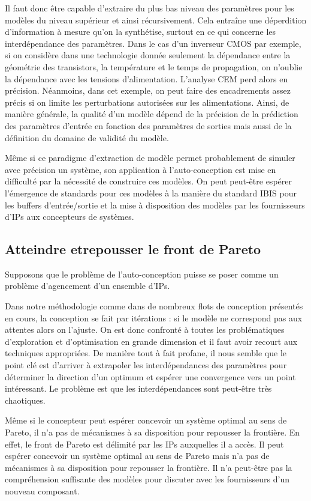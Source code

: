 \documentclass[11pt]{article}
\begin{document}
Il faut donc être capable d'extraire du plus bas niveau des paramètres pour les
modèles du niveau supérieur et ainsi récursivement. Cela entraîne une
déperdition d'information à mesure qu'on la synthétise, surtout en ce qui
concerne les interdépendance des paramètres. Dans le cas d'un inverseur CMOS
par exemple, si on considère dans une technologie donnée seulement la dépendance
entre la géométrie des transistors, la température et le temps de propagation,
on n'oublie la dépendance avec les tensions d'alimentation. L'analyse CEM
perd alors en précision. Néanmoins, dans cet exemple, on peut faire des
encadrements
assez précis si on limite les perturbations autorisées sur les alimentations.
Ainsi, de manière générale, la qualité d'un modèle dépend de la précision de la
prédiction des paramètres d'entrée en fonction des paramètres de sorties mais
aussi de la définition du domaine de validité du modèle.

Même si ce paradigme d'extraction de modèle permet probablement de simuler avec
précision un système, son application à l'auto-conception est mise en difficulté
par la nécessité de construire ces modèles. On peut peut-être espérer 
l'émergence de standards pour ces modèles à la manière du standard IBIS pour les
buffers d'entrée/sortie et la mise à disposition des modèles par les
fournisseurs d'IPs aux concepteurs de systèmes.

\subsection{Atteindre etrepousser le front de Pareto}

Supposons que le problème de l'auto-conception puisse se poser comme un problème
d'agencement d'un ensemble d'IPs.

Dans notre méthodologie comme dans de nombreux flots de conception présentés en
cours, la conception se fait par itérations : si le modèle ne correspond pas aux
attentes alors on l'ajuste. On est donc confronté à toutes les problématiques
d'exploration et d'optimisation en grande dimension et il faut avoir recourt aux
techniques appropriées. De manière tout à fait profane, il nous semble que le 
point clé est d'arriver à extrapoler les interdépendances des paramètres pour
déterminer la direction d'un optimum et espérer une convergence vers un point
intéressant. Le problème est que les interdépendances sont peut-être très 
chaotiques.

Même si le concepteur peut espérer concevoir un système optimal au sens de 
Pareto, il n'a pas de mécanismes à sa disposition pour repousser la frontière. 
En effet, le front de Pareto est délimité par les IPs auxquelles il a accès. 
Il peut espérer concevoir un système optimal au sens de Pareto mais n'a pas de 
mécanismes à sa disposition pour repousser la frontière. Il n'a peut-être pas la
compréhension suffisante des modèles pour discuter avec les fournisseurs d'un
nouveau composant.
\end{document}
